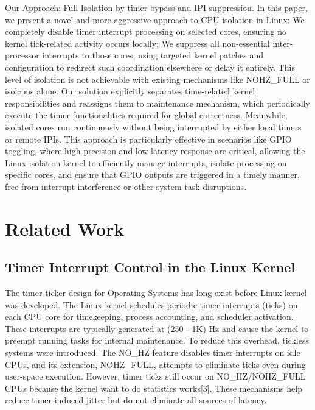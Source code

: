 \documentclass[letterpaper]{article}
\begin{document}
Our Approach: Full Isolation by timer bypass and IPI suppression. In this paper, we present a novel
and more aggressive approach to CPU isolation in Linux: We completely disable timer interrupt
processing on selected cores, ensuring no kernel tick-related activity occurs locally; We suppress
all non-essential inter-processor interrupts to those cores, using targeted kernel patches and
configuration to redirect such coordination elsewhere or delay it entirely. This level of isolation is
not achievable with existing mechanisms like NOHZ\_FULL or isolcpus alone. Our solution explicitly
separates time-related kernel responsibilities and reassigns them to maintenance mechanism,
which periodically execute the timer functionalities required for global correctness. Meanwhile,
isolated cores run continuously without being interrupted by either local timers or remote IPIs.
This approach is particularly effective in scenarios like GPIO toggling, where high precision and
low-latency response are critical, allowing the Linux isolation kernel to efficiently manage interrupts,
isolate processing on specific cores, and ensure that GPIO outputs are triggered in a timely manner,
free from interrupt interference or other system task disruptions.


\section{Related Work}\label{BG} 
\subsection{Timer Interrupt Control in the Linux Kernel}
The timer ticker design for Operating Systems has long exist before Linux kernel was
developed\cite{Corbet}.
The Linux kernel schedules periodic timer interrupts (ticks) on each CPU core for timekeeping,
process accounting, and scheduler activation. These interrupts are typically generated at (250 - 1K) Hz
and cause the kernel to preempt running tasks for internal maintenance.
To reduce this overhead, tickless systems were introduced. The NO\_HZ feature disables timer
interrupts on idle CPUs, and its extension, NOHZ\_FULL, attempts to eliminate ticks even during
user-space execution\cite{KernelDocNOHZ}. However, timer ticks still occur on NO\_HZ/NOHZ\_FULL CPUs because the
kernel want to do statistics works[3].
These mechanisms help reduce timer-induced jitter but do not eliminate all sources of latency.
\end{document}
